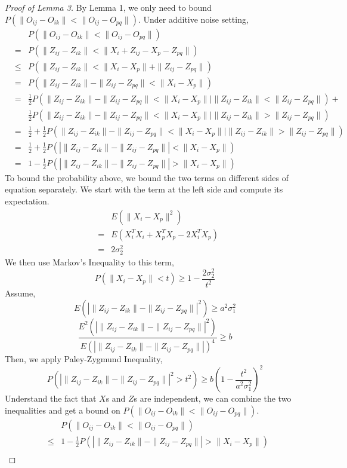 \documentclass{article}
\begin{document}
\begin{proof}[Proof of Lemma 3]
By Lemma 1, we only need to bound $P(\|O_{ij}-O_{ik}\| < \|O_{ij}-O_{pq}\|)$. Under additive noise setting,
\begin{eqnarray*}
& &P(\|O_{ij}-O_{ik}\| < \|O_{ij}-O_{pq}\|) \\
&=&P(\|Z_{ij}-Z_{ik}\| < \|X_{i}+Z_{ij}-X_{p}-Z_{pq}\|) \\
&\leq&P(\|Z_{ij}-Z_{ik}\| < \|X_{i}-X_{p}\| + \|Z_{ij}-Z_{pq}\|) \\
&=& P(\|Z_{ij}-Z_{ik}\|-\|Z_{ij}-Z_{pq}\|< \|X_{i}-X_{p}\|) \\
&=& \frac{1}{2}P(\|Z_{ij}-Z_{ik}\|-\|Z_{ij}-Z_{pq}\|< \|X_{i}-X_{p}\||\|Z_{ij}-Z_{ik}\|<\|Z_{ij}-Z_{pq}\|) + \\ 
& &\frac{1}{2}P(\|Z_{ij}-Z_{ik}\|-\|Z_{ij}-Z_{pq}\|< \|X_{i}-X_{p}\||\|Z_{ij}-Z_{ik}\|>\|Z_{ij}-Z_{pq}\|) \\
&=&\frac{1}{2} + \frac{1}{2}P(\|Z_{ij}-Z_{ik}\|-\|Z_{ij}-Z_{pq}\|< \|X_{i}-X_{p}\||\|Z_{ij}-Z_{ik}\|>\|Z_{ij}-Z_{pq}\|) \\
&=& \frac{1}{2} + \frac{1}{2}P(|\|Z_{ij}-Z_{ik}\|-\|Z_{ij}-Z_{pq}\||< \|X_{i}-X_{p}\|) \\
&=& 1 - \frac{1}{2}P(|\|Z_{ij}-Z_{ik}\|-\|Z_{ij}-Z_{pq}\||> \|X_{i}-X_{p}\|)
\end{eqnarray*}
To bound the probability above, we bound the two terms on different sides of equation separately. We start with the term at the left side and compute its expectation.
 \begin{eqnarray*}
 & &E(\|X_{i}-X_{p}\|^2) \\
 &=&E(X_{i}^T X_{i}+X_{p}^TX_{p} -2X_{i}^T X_{p}) \\
 &=&2\sigma_2^2
 \end{eqnarray*}
 We then use Markov's Inequality to this term, 
 \[P(\|X_{i}-X_{p}\| < t) \geq 1 - \frac{2 \sigma_2^2}{t^2} \]
Assume, 
\[E(|\|Z_{ij}-Z_{ik}\|-\|Z_{ij}-Z_{pq}\||^2) \geq a^2 \sigma_1^2\]
\[\frac{E^2(|\|Z_{ij}-Z_{ik}\|-\|Z_{ij}-Z_{pq}\||^2)}{E(|\|Z_{ij}-Z_{ik}\|-\|Z_{ij}-Z_{pq}\||)^4} \geq b \]
Then, we apply Paley-Zygmund Inequality,
\[P(|\|Z_{ij}-Z_{ik}\|-\|Z_{ij}-Z_{pq}\||^2 > t^2 ) \geq b(1-\frac{t^2}{a^2 \sigma_1^2})^2 \]
Understand the fact that $X$s and $Z$s are independent, we can combine the two inequalities and get a bound on $P(\|O_{ij}-O_{ik}\| < \|O_{ij}-O_{pq}\|)$.
\begin{eqnarray*}
& &P(\|O_{ij}-O_{ik}\| < \|O_{ij}-O_{pq}\|) \\
&\leq& 1 - \frac{1}{2}P(|\|Z_{ij}-Z_{ik}\|-\|Z_{ij}-Z_{pq}\||> \|X_{i}-X_{p}\|)\\

\end{eqnarray*}
\end{proof}
\end{document}
